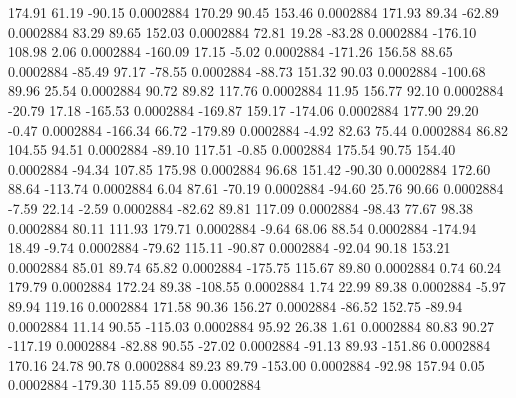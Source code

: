       174.91       61.19      -90.15     0.0002884
      170.29       90.45      153.46     0.0002884
      171.93       89.34      -62.89     0.0002884
       83.29       89.65      152.03     0.0002884
       72.81       19.28      -83.28     0.0002884
     -176.10      108.98        2.06     0.0002884
     -160.09       17.15       -5.02     0.0002884
     -171.26      156.58       88.65     0.0002884
      -85.49       97.17      -78.55     0.0002884
      -88.73      151.32       90.03     0.0002884
     -100.68       89.96       25.54     0.0002884
       90.72       89.82      117.76     0.0002884
       11.95      156.77       92.10     0.0002884
      -20.79       17.18     -165.53     0.0002884
     -169.87      159.17     -174.06     0.0002884
      177.90       29.20       -0.47     0.0002884
     -166.34       66.72     -179.89     0.0002884
       -4.92       82.63       75.44     0.0002884
       86.82      104.55       94.51     0.0002884
      -89.10      117.51       -0.85     0.0002884
      175.54       90.75      154.40     0.0002884
      -94.34      107.85      175.98     0.0002884
       96.68      151.42      -90.30     0.0002884
      172.60       88.64     -113.74     0.0002884
        6.04       87.61      -70.19     0.0002884
      -94.60       25.76       90.66     0.0002884
       -7.59       22.14       -2.59     0.0002884
      -82.62       89.81      117.09     0.0002884
      -98.43       77.67       98.38     0.0002884
       80.11      111.93      179.71     0.0002884
       -9.64       68.06       88.54     0.0002884
     -174.94       18.49       -9.74     0.0002884
      -79.62      115.11      -90.87     0.0002884
      -92.04       90.18      153.21     0.0002884
       85.01       89.74       65.82     0.0002884
     -175.75      115.67       89.80     0.0002884
        0.74       60.24      179.79     0.0002884
      172.24       89.38     -108.55     0.0002884
        1.74       22.99       89.38     0.0002884
       -5.97       89.94      119.16     0.0002884
      171.58       90.36      156.27     0.0002884
      -86.52      152.75      -89.94     0.0002884
       11.14       90.55     -115.03     0.0002884
       95.92       26.38        1.61     0.0002884
       80.83       90.27     -117.19     0.0002884
      -82.88       90.55      -27.02     0.0002884
      -91.13       89.93     -151.86     0.0002884
      170.16       24.78       90.78     0.0002884
       89.23       89.79     -153.00     0.0002884
      -92.98      157.94        0.05     0.0002884
     -179.30      115.55       89.09     0.0002884
